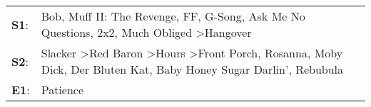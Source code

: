 \begin{supertabular}{p{0.03\textwidth}p{0.92\textwidth}}
 \textbf{S1}:  &                                                                            Bob\textsuperscript{}, \enspace Muff II: The Revenge\textsuperscript{}, \enspace FF\textsuperscript{}, \enspace G-Song\textsuperscript{}, \enspace Ask Me No Questions\textsuperscript{}, \enspace 2x2\textsuperscript{}, \enspace Much Obliged\textsuperscript{} \textgreater \enspace Hangover\textsuperscript{}  \enspace  \\
 \textbf{S2}:  &  Slacker\textsuperscript{} \textgreater \enspace Red Baron\textsuperscript{} \textgreater \enspace Hours\textsuperscript{} \textgreater \enspace Front Porch\textsuperscript{}, \enspace Rosanna\textsuperscript{}, \enspace Moby Dick\textsuperscript{}, \enspace Der Bluten Kat\textsuperscript{}, \enspace Baby Honey Sugar Darlin'\textsuperscript{}, \enspace Rebubula\textsuperscript{}  \enspace  \\
 \textbf{E1}:  &                                                                                                                                                                                                                                                                                                                                                                    Patience\textsuperscript{}  \enspace  \\
\end{supertabular}
